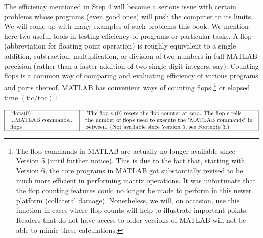 \documentclass[../main.tex]{subfiles}
\begin{document}
The efficiency mentioned in Step 4 will become a serious issue with certain problems whose programs (even good ones) will push the computer to its limits. We will come up with many examples of such problems this book. We mention here two useful tools in testing efficiency of programs or particular tasks. A flop (abbreviation for floating point operation) is roughly equivalent to a single addition, subtraction, multiplication, or division of two numbers in full MATLAB precision (rather than a faster addition of two single-digit integers, say). Counting flops is a common way of comparing and evaluating efficiency of various programs and parts thereof. MATLAB has convenient ways of counting flops \footnote[4]{ The flop commands in MATLAB are actually no longer available since Version 5 (until further notice). This is due to the fact that, starting with Version 6, the core programs in MATLAB got substantially revised to be much more efficient in performing matrix operations. It was unfortunate that the flop counting features could no longer be made to perform in this newer platform (collateral damage). Nonetheless, we will, on occasion, use this function in cases where flop counts will help to illustrate important points. Readers that do not have access to older versions of MATLAB will not be
able to mimic these calculations.} or elapsed time $(\mathrm{tic} / \mathrm{toc})$ :

$
\begin{array}{|l|l|}
\hline \begin{array}{l}
\text { flops(0) }\\
\text {...MATLAB commands...}\\
\text {flops }\\
\end{array} & \begin{array}{l}
\text { The flop s (0) resets the flop counter at zero. The flop s tells } \\
\text {the number of flops used to execute the "MATLAB commands" in}\\
\text {between. (Not available since Version 5, see Footnote 3.)} \\
\end{array} \\
\hline
\end{array}
$ \\
\end{document}
